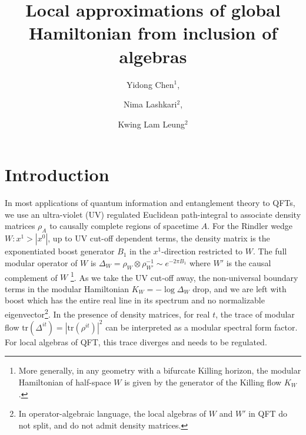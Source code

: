 \documentclass[a4paper,11pt]{article}
\theoremstyle{definition}
\newcommand{\tr}{\text{tr}}
\begin{document}
\title{Local approximations of global Hamiltonian from inclusion of algebras}


\author{Yidong Chen$^1$,}
\author{Nima Lashkari$^2$,}
\author{Kwing Lam Leung$^2$}





\maketitle

\section{Introduction}
In most applications of quantum information and entanglement theory to QFTs, we use an ultra-violet (UV) regulated Euclidean path-integral to associate density matrices $\rho_A$ to causally complete regions of spacetime $A$. For the Rindler wedge $W:x^1>|x^0|$, up to UV cut-off dependent terms, the density matrix is the exponentiated boost generator $B_1$ in the $x^1$-direction restricted to $W$. The full modular operator of $W$ is $\Delta_W=\rho_W\otimes \rho_{W'}^{-1}\sim e^{-2\pi B_1}$ where $W'$ is the causal complement of $W$ \footnote{More generally, in any geometry with a bifurcate Killing horizon, the modular Hamiltonian of half-space $W$ is given by the generator of the Killing flow $K_W$.}. As we take the UV cut-off away, the non-universal boundary terms in the modular Hamiltonian $K_W=-\log \Delta_W$ drop, and we are left with boost which has the entire real line in its spectrum and no normalizable eigenvector\footnote{In operator-algebraic language, the local algebras of $W$ and $W'$ in QFT do not split, and do not admit density matrices.}. In the presence of density matrices, for real $t$, the trace of modular flow  $\tr(\Delta^{it})=|\tr(\rho^{it})|^2$ can be interpreted as a modular spectral form factor. For local algebras of QFT, this trace diverges and needs to be regulated.
\end{document}
